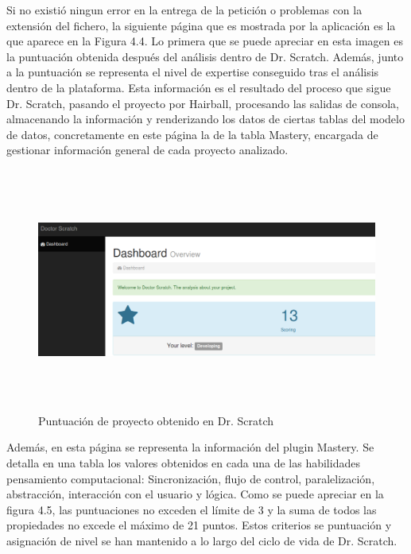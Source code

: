 \documentclass[a4paper, 12pt]{book}
\begin{document}
Si no existió ningun error en la entrega de la petición o problemas con la extensión del
fichero, la siguiente página que es mostrada por la aplicación es la que aparece en la
Figura 4.4. Lo primera que se puede apreciar en esta imagen es la puntuación obtenida 
después del análisis dentro de Dr. Scratch. Además, junto a la puntuación se representa
el nivel de expertise conseguido tras el análisis dentro de la plataforma. Esta 
información es el resultado del proceso que sigue Dr. Scratch, pasando el proyecto por
Hairball, procesando las salidas de consola, almacenando la información y renderizando los
datos de ciertas tablas del modelo de datos, concretamente en este página la de la tabla
Mastery, encargada de gestionar información general de cada proyecto analizado. 


 \begin{figure}[h]
    \centering
		\graphicspath{{img/}}
    \includegraphics[bb=0 0 800 600, width=16cm, height=8cm, keepaspectratio]{puntuacion.png}
		\caption{Puntuación de proyecto obtenido en Dr. Scratch}
    \label{figura:foro_hilos}
 \end{figure} 


Además, en esta página se representa la información del plugin Mastery. Se detalla
en una tabla los valores obtenidos en cada una de las habilidades pensamiento
computacional: Sincronización, flujo de control, paralelización, abstracción,
interacción con el usuario y lógica. Como se puede apreciar en la figura 4.5, las
puntuaciones no exceden el límite de 3 y la suma de todos las propiedades no excede
el máximo de 21 puntos. Estos criterios se puntuación y asignación de nivel se han
mantenido a lo largo del ciclo de vida de Dr. Scratch. \\
\end{document}

